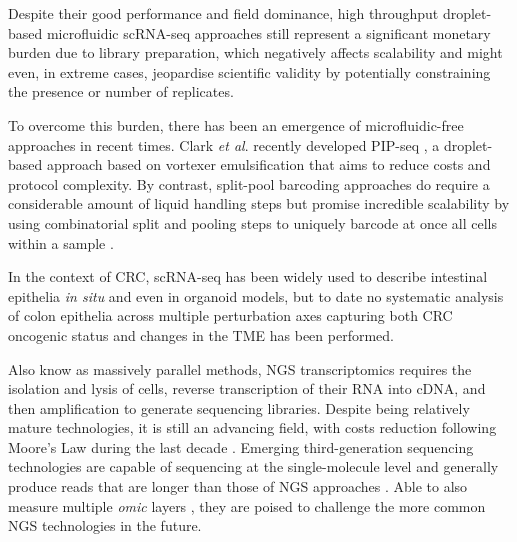 Despite their good performance and field dominance, high throughput droplet-based microfluidic scRNA-seq approaches still represent a significant monetary burden due to library preparation, which negatively affects scalability and might even, in extreme cases, jeopardise scientific validity by potentially constraining the presence or number of replicates. \colorbox{yellow}{\cite{zimmerman_practical_2021}}

To overcome this burden, there has been an emergence of microfluidic-free approaches in recent times. Clark \textit{et al}. recently developed PIP-seq \cite{clark_microfluidics-free_2023}, a droplet-based approach based on vortexer emulsification that aims to reduce costs and protocol complexity. By contrast, split-pool barcoding approaches do require a considerable amount of liquid handling steps but promise incredible scalability by using combinatorial split and pooling steps to uniquely barcode at once all cells within a sample \cite{rosenberg_single-cell_2018}.

In the context of CRC, scRNA-seq has been widely used to describe intestinal epithelia \emph{in situ} \cite{haber_single-cell_2017} and even in organoid models, but to date no systematic analysis of colon epithelia across multiple perturbation axes capturing both CRC oncogenic status and changes in the TME has been performed. 

Also know as massively parallel methods, NGS transcriptomics requires the isolation and lysis of cells, reverse transcription of their RNA into cDNA, and then amplification to generate sequencing libraries. Despite being relatively mature technologies, it is still an advancing field, with costs reduction following Moore's Law during the last decade \cite{wetterstrand_dna_2022}.
Emerging third-generation sequencing technologies \cite{check_hayden_genome_2009} are capable of sequencing at the single-molecule level and generally produce reads that are longer than those of NGS approaches \cite{eid_real-time_2009,deamer_three_2016}. Able to also measure multiple \emph{omic} layers \cite{ni_deepsignal_2019}, they are poised to challenge the more common NGS technologies in the future.


